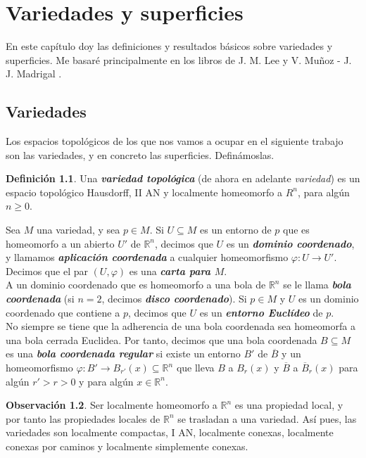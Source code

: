 \documentclass[10pt]{report}
\newcommand{\R}{\mathbb{R}}
\newcommand{\enfatiza}[1]{\textbf{\textit{#1}}}
\theoremstyle{definition}
\newtheorem{defin}{Definición}[section]
\newtheorem{obs}[defin]{Observación}
\begin{document}
\chapter{Variedades y superficies}
\setcounter{page}{1}
En este capítulo doy las definiciones y resultados básicos sobre variedades y superficies. Me basaré principalmente en los libros de J. M. Lee \cite{lee1} y V. Muñoz - J. J. Madrigal \cite{juanjo}.\\

\section{Variedades}\label{sec:variedades}
Los espacios topológicos de los que nos vamos a ocupar en el siguiente trabajo son las variedades, y en concreto las superficies. Definámoslas.
\begin{defin}\label{def:variedad}%
Una \textbf{\emph{variedad topológica}} (de ahora en adelante \emph{variedad}) es un espacio topológico Hausdorff, II AN y localmente homeomorfo a $R^n$, para algún $n\geq 0$.
\end{defin}
Sea $M$ una variedad, y sea $p\in M$. Si $U\subseteq M$ es un entorno de $p$ que es homeomorfo a un abierto $U'$ de $\R^n$, decimos que $U$ es un \enfatiza{dominio coordenado}, y llamamos \enfatiza{aplicación coordenada} a cualquier homeomorfismo $\varphi :U\to U'$. Decimos que el par $(U,\varphi )$ es una \enfatiza{carta para $M$}.\\
A un dominio coordenado que es homeomorfo a una bola de $\R^n$ se le llama \enfatiza{bola coordenada} (si $n=2$, decimos \enfatiza{disco coordenado}). Si $p\in M$ y $U$ es un dominio coordenado que contiene a $p$, decimos que $U$ es un \enfatiza{entorno Euclídeo} de $p$.\\
No siempre se tiene que la adherencia de una bola coordenada sea homeomorfa a una bola cerrada Euclidea. Por tanto, decimos que una bola coordenada $B\subseteq M$ es una \enfatiza{bola coordenada regular} si existe un entorno $B'$ de $\overline{B}$ y un homeomorfismo $\varphi:B'\to B_{r'}(x)\subseteq \R^n$ que lleva $B$ a $B_r(x)$ y $\overline{B}$ a $\overline{B}_r(x)$ para algún $r'>r>0$ y para algún $x\in \R^n$.
\begin{obs}%
Ser localmente homeomorfo a $\R^n$ es una propiedad local, y por tanto las propiedades locales de $\R^n$ se trasladan a una variedad. Así pues, las variedades son localmente compactas, I AN, localmente conexas, localmente conexas por caminos y localmente simplemente conexas.
\end{obs}
\end{document}
